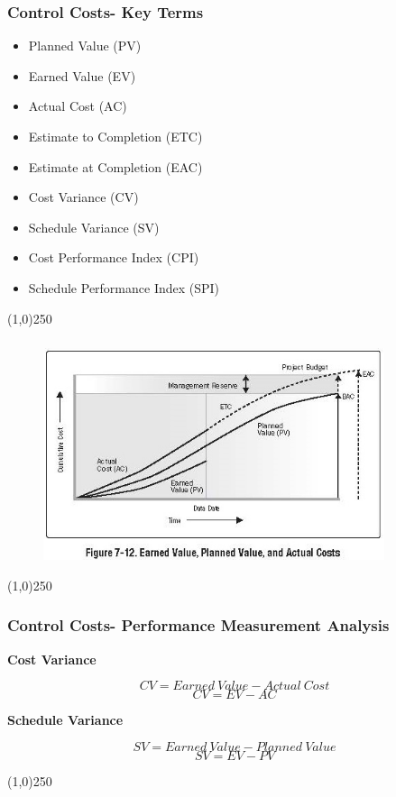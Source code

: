 \begin{frame}
\frametitle{Control Costs- Key Terms}
\begin{itemize}
	\item Planned Value (PV)
	\item Earned Value (EV)
	\item Actual Cost (AC)
	\item Estimate to Completion (ETC)
	\item Estimate at Completion (EAC)
	\item Cost Variance (CV)
	\item Schedule Variance (SV)
	\item Cost Performance Index (CPI)
	\item Schedule Performance Index (SPI)
\end{itemize}
\end{frame}
\begin{center}\line(1,0){250}\end{center}






\begin{frame}
\frametitle{}
\begin{figure}
	\centering
		\includegraphics[width = 10cm]{images/Fig7-12.jpg}
	\label{fig:Fig7-12}
\end{figure}

\end{frame}
\begin{center}\line(1,0){250}\end{center}







\begin{frame}
\frametitle{Control Costs- Performance Measurement Analysis}
\textbf{Cost Variance}

\[
	CV = Earned \: Value - Actual\: Cost
\]
\[
	CV = EV - AC
\]

\textbf{Schedule Variance}

\[
	SV = Earned \:Value - Planned \:Value
\]
\[
	SV = EV - PV
\]

\end{frame}
\begin{center}\line(1,0){250}\end{center}







